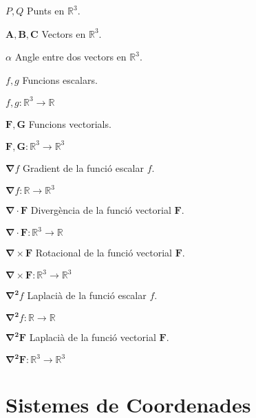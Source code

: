 \documentclass[catalan,a4paper,twoside,11pt]{article}
\begin{document}
\begin{list}{}
   \item[$P, Q$] Punts en $\mathbb{R}^3$.

   \item[$\boldsymbol{A,B,C}$] Vectors en $\mathbb{R}^3$.

   \item[$\alpha$] Angle entre dos vectors en $\mathbb{R}^3$.

   \item[$f,g$] Funcions escalars.

   $f,g \colon \mathbb{R}^3\rightarrow\mathbb{R}$

   \item[$\boldsymbol{F,G}$] Funcions vectorials.

   $\boldsymbol{F,G}\colon\mathbb{R}^3\rightarrow\mathbb{R}^3$

   \item[$\boldsymbol{\nabla}f$] Gradient de la funció escalar $f$.

   $\boldsymbol{\nabla}f\colon\mathbb{R}\rightarrow\mathbb{R}^3$

   \item[$\boldsymbol{\nabla\cdot F}$] Divergència de la funció vectorial $\boldsymbol{F}$.

   $\boldsymbol{\nabla\cdot F}\colon \mathbb{R}^3\rightarrow\mathbb{R}$

   \item[$\boldsymbol{\nabla\times F}$] Rotacional de la funció vectorial $\boldsymbol{F}$.

   $\boldsymbol{\nabla\times F}\colon   \mathbb{R}^3\rightarrow\mathbb{R}^3$

   \item[$\boldsymbol{\nabla^2}f$] Laplacià de la funció escalar $f$.

   $\boldsymbol{\nabla^2}f\colon \mathbb{R}\rightarrow\mathbb{R}$

   \item[$\boldsymbol{\nabla^2F}$] Laplacià de la funció vectorial $\boldsymbol{F}$.

    $\boldsymbol{\nabla^2F}\colon \mathbb{R}^3\rightarrow\mathbb{R}^3$
\end{list}

\newcommand{\va}{\ensuremath{\,\boldsymbol{e_x}}}
\newcommand{\vb}{\ensuremath{\,\boldsymbol{e_y}}}
\newcommand{\vc}{\ensuremath{\,\boldsymbol{e_z}}}
\section{Sistemes de Coordenades}
\end{document}
